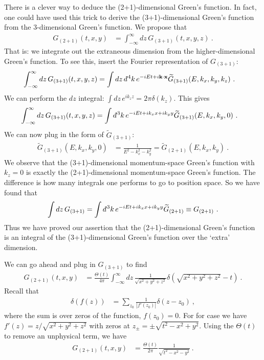 There is a clever way to deduce the (2+1)-dimensional Green's function. In fact, one could have used this trick to derive the (3+1)-dimensional Green's function from the 3-dimensional Green's function. We propose that
\begin{align}
	G_{(2+1)}(t,x,y) &= \int_{-\infty}^\infty dz\, G_{(3+1)}(t,x,y,z) \ .
\end{align}
That is: we integrate out the extraneous dimension from the higher-dimensional Green's function. To see this, insert the Fourier representation of $G_{(3+1)}$:
\begin{align}
	\int_{-\infty}^\infty dz\, G_{(3+1)}(t,x,y,z)
	&=
	\int dz\,\dbar^4k\, e^{-iEt+i\vec{k}\cdot\vec{x}} \tilde G_{(3+1)}(E,k_x,k_y,k_z) \ .
\end{align}
We can perform the $dz$ integral: $\int dz \,e^{ik_zz} = 2\pi \delta(k_z)$. This gives
\begin{align}
	\int_{-\infty}^\infty dz\, G_{(3+1)}(t,x,y,z)
	&=
	\int \dbar^3k\, e^{-iEt+ik_xx+ik_yy} \tilde G_{(3+1)}(E,k_x,k_y,0) \ .
\end{align}
We can now plug in the form of $\tilde G_{(3+1)}$:
\begin{align}
	\tilde G_{(3+1)}(E,k_x,k_y,0) &=\frac{1}{E^2-k_x^2-k_y^2} = \tilde G_{(2+1)}(E,k_x,k_y) \ .
\end{align}
 We observe that the (3+1)-dimensional momentum-space Green's function with $k_z=0$ is exactly the (2+1)-dimensional momentum-space Green's function. The difference is how many integrals one performs to go to position space. So we have found that
\begin{align}
	\int dz\, G_{(3+1)} = \int \dbar^3k\, e^{-iEt+ik_xx +ik_y y} \tilde G_{(2+1)}
	\equiv G_{(2+1)} \ .
\end{align}
Thus we have proved our assertion that the (2+1)-dimensional Green's function is an integral of the (3+1)-dimensional Green's function over the `extra' dimension.

We can go ahead and plug in $G_{(3+1)}$ to find
\begin{align}
	G_{(2+1)}(t,x,y) 
	&= \frac{\Theta(t)}{4\pi}\int_{-\infty}^{\infty}dz\,
	\frac{1}{\sqrt{x^2+y^2 + z^2}}
	\delta(\sqrt{x^2+y^2+z^2}-t) \ .
\end{align}
Recall that
\begin{align}
	\delta(f(z)) &= \sum_{z_0} \frac{1}{|f'(z_0)|} \delta(z-z_0) \ ,
\end{align}
where the sum is over zeros of the function, $f(z_0)=0$. For for case we have $f'(z) = z/\sqrt{x^2+y^2+z^2}$ with zeros at $z_\pm = \pm \sqrt{t^2 - x^2+y^2}$. Using the $\Theta(t)$ to remove an unphysical term, we have
\begin{align}
	G_{(2+1)}(t,x,y) &= \frac{\Theta(t)}{2\pi} \frac{1}{\sqrt{t^2-x^2-y^2}} \ .
\end{align}


